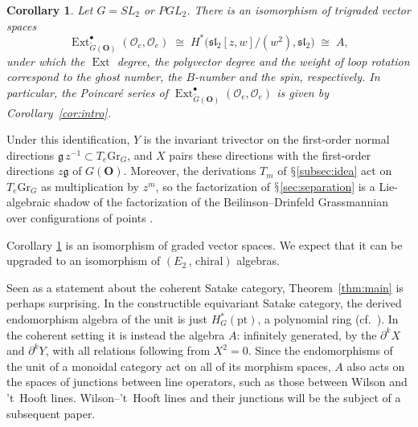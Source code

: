 \documentclass[11pt]{amsart}
\numberwithin{equation}{section}
\renewcommand{\S}{\mbox{$\mathsection$}}
\newtheorem{corollary}[theorem]{Corollary}
\theoremstyle{definition}
\theoremstyle{remark}
\newcommand{\g}{\mathfrak{g}}
\newcommand{\sltwo}{\mathfrak{sl}_2}
\newcommand{\dd}{\partial}
\newcommand{\cO}{\mathcal{O}}
\newcommand{\bO}{\mathbf{O}}
\newcommand{\Gr}{\mathrm{Gr}}
\newcommand{\Ext}{\operatorname{Ext}}
\begin{document}
\begin{corollary}\label{cor:Gr}
Let $G=SL_2$ or $PGL_2$. There is an isomorphism of trigraded vector spaces
\begin{equation}\label{eq:Gr-ext}
\Ext^\bullet_{\widetilde G(\bO)}(\cO_e,\cO_e)\;\cong\;H^*\bigl(\sltwo[z,w]/(w^2),\sltwo\bigr)\;\cong\;A,
\end{equation}
under which the $\Ext$ degree, the polyvector degree and the weight of loop rotation correspond to the ghost number, the $B$-number and the spin, respectively. In particular, the Poincar\'e series of $\Ext^\bullet_{\widetilde G(\bO)}(\cO_e,\cO_e)$ is given by Corollary~\ref{cor:intro}.
\end{corollary}

Under this identification, $Y$ is the invariant trivector on the first-order normal directions $\g\,z^{-1}\subset T_e\Gr_G$, and $X$ pairs these directions with the first-order directions $z\g$ of $G(\bO)$. Moreover, the derivations $T_m$ of \S\ref{subsec:idea} act on $T_e\Gr_G$ as multiplication by $z^m$, so the factorization of \S\ref{sec:separation} is a Lie-algebraic shadow of the factorization of the Beilinson--Drinfeld Grassmannian over configurations of points \cite{BD04,MV07}.

Corollary \ref{cor:Gr} is an isomorphism of graded vector spaces. We expect that it can be upgraded to an isomorphism of $(E_2 \,, \, \text{chiral})$ algebras. 

Seen as a statement about the coherent Satake category, Theorem~\ref{thm:main} is perhaps surprising. In the constructible equivariant Satake category, the derived endomorphism algebra of the unit is just $H^*_{G}(\mathrm{pt})$, a polynomial ring (cf.\ \cite{BF08}). In the coherent setting it is instead the algebra $A$: infinitely generated, by the $\dd^kX$ and $\dd^kY$, with all relations following from $X^2=0$. Since the endomorphisms of the unit of a monoidal category act on all of its morphism spaces, $A$ also acts on the spaces of junctions between line operators, such as those between Wilson and 't~Hooft lines. Wilson--'t~Hooft lines and their junctions will be the subject of a subsequent paper.
\end{document}
